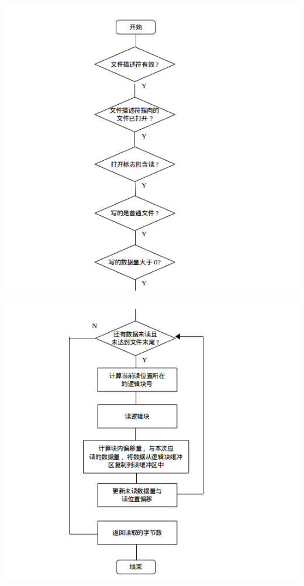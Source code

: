 \documentclass[nofonts]{ctexart}
\begin{document}
\begin{itemize}
  \includegraphics[width=15cm]{./images/./read_1.png}

  \includegraphics[width=15cm]{./images/./read_2.png}
  \end{itemize}
\end{document}
